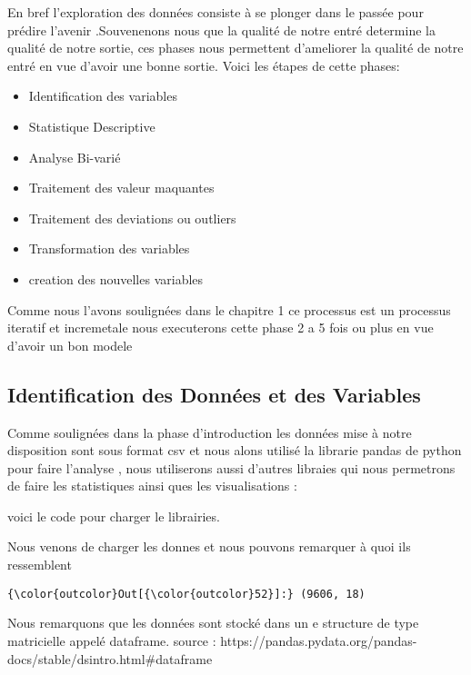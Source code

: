 \documentclass[11pt]{article}
\providecommand{\tightlist}{%
      \setlength{\itemsep}{0pt}\setlength{\parskip}{0pt}}
\begin{document}
En bref l'exploration des données consiste à se plonger dans le passée
pour prédire l'avenir .Souvenenons nous que la qualité de notre entré
determine la qualité de notre sortie, ces phases nous permettent
d'ameliorer la qualité de notre entré en vue d'avoir une bonne sortie.
Voici les étapes de cette phases:

\begin{itemize}
\tightlist
\item
  Identification des variables
\item
  Statistique Descriptive
\item
  Analyse Bi-varié
\item
  Traitement des valeur maquantes
\item
  Traitement des deviations ou outliers
\item
  Transformation des variables
\item
  creation des nouvelles variables
\end{itemize}

Comme nous l'avons soulignées dans le chapitre 1 ce processus est un
processus iteratif et incremetale nous executerons cette phase 2 a 5
fois ou plus en vue d'avoir un bon modele

    \subsection{Identification des Données et des
Variables}\label{identification-des-donnuxe9es-et-des-variables}

    Comme soulignées dans la phase d'introduction les données mise à notre
disposition sont sous format csv et nous alons utilisé la librarie
pandas de python pour faire l'analyse , nous utiliserons aussi d'autres
libraies qui nous permetrons de faire les statistiques ainsi ques les
visualisations :

voici le code pour charger le librairies.

    Nous venons de charger les donnes et nous pouvons remarquer à quoi ils
ressemblent

            \begin{Verbatim}[commandchars=\\\{\}]
{\color{outcolor}Out[{\color{outcolor}52}]:} (9606, 18)
\end{Verbatim}
        
    Nous remarquons que les données sont stocké dans un e structure de type
matricielle appelé dataframe. source :
https://pandas.pydata.org/pandas-docs/stable/dsintro.html\#dataframe
\end{document}
